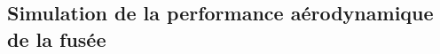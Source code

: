 \subsection{Simulation de la performance aérodynamique de la fusée}
\label{subsec:simulation_performance}
